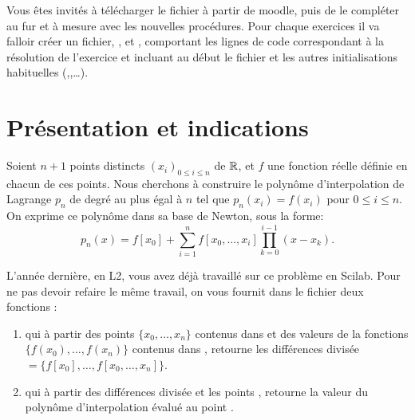 \documentclass[a4paper,12pt,reqno]{amsart}
\begin{document}

Vous êtes invités à télécharger le fichier  à partir de moodle, puis de le compléter au fur et à mesure avec les nouvelles procédures. Pour chaque exercices il va falloir créer un fichier, ,  et , comportant les lignes de code correspondant à la résolution de l'exercice et incluant au début le fichier  et les autres initialisations habituelles (,,\ldots).



\section{Présentation et indications}

Soient $n+1$ points distincts $(x_i)_{0 \leq i \leq n}$ de $\mathbb{R}$, et $f$ une fonction réelle définie en chacun de ces points. Nous cherchons à construire le polynôme d'interpolation de Lagrange $p_n$ de degré au plus égal à $n$ tel que $p_n(x_i)=f(x_i)$ pour $ 0 \leq i \leq n$. On exprime ce polynôme dans sa base de Newton, sous la forme:
    $$
        p_n(x)= f[x_0]+ \sum_{i=1}^n f[x_0,\ldots,x_i] \prod_{k=0}^{i-1} (x-x_k).
    $$

L'année dernière, en L2, vous avez déjà travaillé sur ce problème en Scilab. Pour ne pas devoir refaire le même travail, on vous fournit dans le fichier  deux fonctions :
\begin{enumerate}
     \item {} qui à partir des points $\{x_0,\ldots,x_n\}$ contenus dans  et des valeurs de la fonctions $\{f(x_0),\ldots,f(x_n)\}$ contenus dans , retourne les différences divisée $=\{f[x_0],\ldots,f[x_0,\ldots,x_n]\}$.
     \item {} qui à partir des différences divisée  et les points , retourne la valeur du polynôme d'interpolation évalué au point .
 \end{enumerate}


\end{document}
